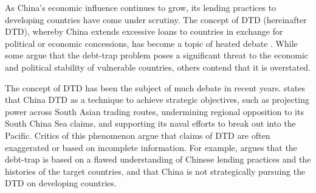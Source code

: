 As China's economic influence continues to grow, its lending practices to developing countries have come under scrutiny.
The concept of DTD (hereinafter DTD), whereby China extends excessive loans to countries in exchange for political or economic concessions, has become a topic of heated debate \citet{Chellaney_2017}.
While some argue that the debt-trap problem poses a significant threat to the economic and political stability of vulnerable countries, others contend that it is overstated.

The concept of DTD has been the subject of much debate in recent years.
\citet*{Parker2018} states that China DTD as a technique to achieve strategic objectives, such as projecting power across South Asian trading routes, undermining regional opposition to its South China Sea claims, and supporting its naval efforts to break out into the Pacific.
Critics of this phenomenon argue that claims of DTD are often exaggerated or based on incomplete information. For example, \citet*{Brautigam-meme-2020} argues that the debt-trap is based on a flawed understanding of Chinese lending practices and the histories of the target countries, and that China is not strategically pursuing the DTD on developing countries.

